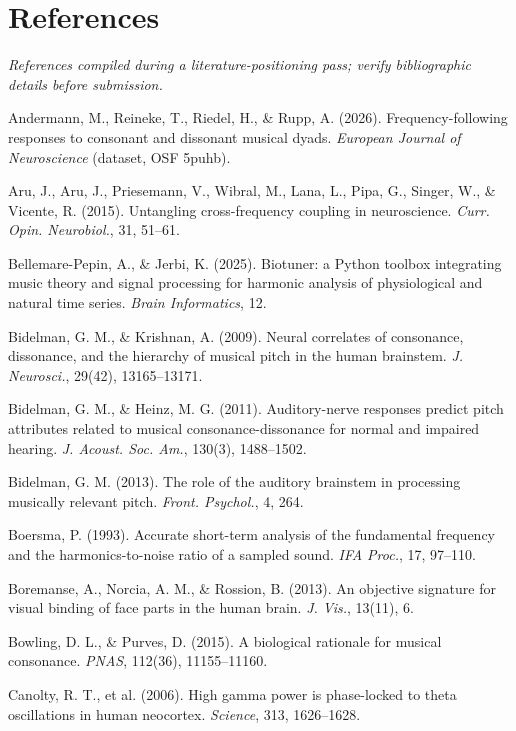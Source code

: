\documentclass[11pt]{article}
\begin{document}
\section*{References}
\textit{\small References compiled during a literature-positioning pass; verify bibliographic details before submission.}\par\vspace{4pt}
\begingroup\small
\begin{list}{}{\setlength{\itemsep}{1pt}\setlength{\leftmargin}{1.2em}\setlength{\itemindent}{-1.2em}}
\item Andermann, M., Reineke, T., Riedel, H., \& Rupp, A. (2026). Frequency-following responses to consonant and dissonant musical dyads. \emph{European Journal of Neuroscience} (dataset, OSF 5puhb).
\item Aru, J., Aru, J., Priesemann, V., Wibral, M., Lana, L., Pipa, G., Singer, W., \& Vicente, R. (2015). Untangling cross-frequency coupling in neuroscience. \emph{Curr. Opin. Neurobiol.}, 31, 51–61.
\item Bellemare-Pepin, A., \& Jerbi, K. (2025). Biotuner: a Python toolbox integrating music theory and signal processing for harmonic analysis of physiological and natural time series. \emph{Brain Informatics}, 12.
\item Bidelman, G. M., \& Krishnan, A. (2009). Neural correlates of consonance, dissonance, and the hierarchy of musical pitch in the human brainstem. \emph{J. Neurosci.}, 29(42), 13165–13171.
\item Bidelman, G. M., \& Heinz, M. G. (2011). Auditory-nerve responses predict pitch attributes related to musical consonance-dissonance for normal and impaired hearing. \emph{J. Acoust. Soc. Am.}, 130(3), 1488–1502.
\item Bidelman, G. M. (2013). The role of the auditory brainstem in processing musically relevant pitch. \emph{Front. Psychol.}, 4, 264.
\item Boersma, P. (1993). Accurate short-term analysis of the fundamental frequency and the harmonics-to-noise ratio of a sampled sound. \emph{IFA Proc.}, 17, 97–110.
\item Boremanse, A., Norcia, A. M., \& Rossion, B. (2013). An objective signature for visual binding of face parts in the human brain. \emph{J. Vis.}, 13(11), 6.
\item Bowling, D. L., \& Purves, D. (2015). A biological rationale for musical consonance. \emph{PNAS}, 112(36), 11155–11160.
\item Canolty, R. T., et al. (2006). High gamma power is phase-locked to theta oscillations in human neocortex. \emph{Science}, 313, 1626–1628.

\end{list}
\end{document}
